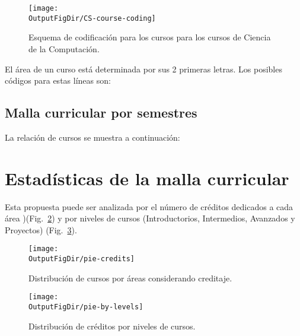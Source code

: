 \begin{figure}[ht]
   \centering
      \texttt{[image: \\OutputFigDir/CS-course-coding]} 
   \caption{Esquema de codificación para los cursos para los cursos de Ciencia de la Computación.}
   \label{fig:cs-course-number}
\end{figure}

El área de un curso está determinada por sus 2 primeras letras. Los posibles códigos para estas lí­neas son:
% 

\begin{landscape}
\section{Malla curricular por semestres}\label{sec:courses-by-semester}
La relación de cursos se muestra a continuación:
%

\end{landscape}

\section{Estadí­sticas de la malla curricular}
Esta propuesta puede ser analizada por el número de créditos dedicados a cada área )(Fig.~\ref{fig:pie-credits}) %
y por niveles de cursos (Introductorios, Intermedios, Avanzados y Proyectos) (Fig.~\ref{fig:pie-by-levels}).

\vspace{0.5cm}
\begin{figure}[h!]
      \centering
      \texttt{[image: \\OutputFigDir/pie-credits]}
      \label{fig:pie-credits}
      \caption{Distribución de cursos por áreas considerando creditaje.}
\end{figure}

\begin{figure}[h!]
      \centering
      \texttt{[image: \\OutputFigDir/pie-by-levels]}
      \label{fig:pie-by-levels}
      \caption{Distribución de créditos por niveles de cursos.}
\end{figure}

